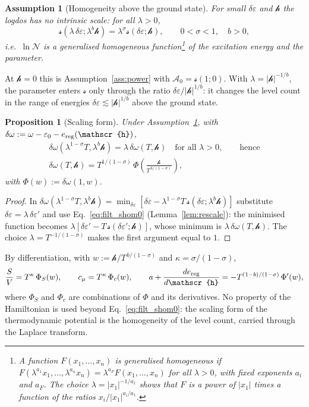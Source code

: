 \documentclass[10pt,a4paper]{article}
\theoremstyle{plain}
\newtheorem{proposition}{Proposition}
\newtheorem{assumption}{Assumption}
\newcommand{\cN}{\mathcal{N}}   %
\newcommand{\cA}{{\mathcal{A}_0}}   %
\newcommand{\lndos}{{logdos}}  %
\newcommand{\hfield}{\mathscr{h}}  %
\newcommand{\lds}{\mathscr{s}}  %
\begin{document}
\begin{assumption}[Homogeneity above the ground state]\label{ass:hom0}
For small $\delta\varepsilon$ and $\hfield$ the \lndos{} has no intrinsic
scale: for all $\lambda>0$,
\begin{equation}\label{eq:filt_shom0}
  \lds(\lambda\,\delta\varepsilon;\lambda^{b}\hfield)=\lambda^{\sigma}\lds(\delta\varepsilon;\hfield) ,
  \qquad 0<\sigma<1 ,\quad b>0 ,
\end{equation}
i.e.\ $\ln\cN$ is a generalised homogeneous function\footnote{A function
$F(x_1,\dots,x_n)$ is \emph{generalised homogeneous} if
$F(\lambda^{a_1}x_1,\dots,\lambda^{a_n}x_n)=\lambda^{a_F}F(x_1,\dots,x_n)$ for
all $\lambda>0$, with fixed exponents $a_i$ and $a_F$. The choice
$\lambda=|x_1|^{-1/a_1}$ shows that $F$ is a power of $|x_1|$ times a
function of the ratios $x_i/|x_1|^{a_i/a_1}$.} of the excitation energy and
the parameter.
\end{assumption}
At $ \hfield=0 $ this is Assumption~\ref{ass:power} with $ \cA = \lds(1;0) $.
With $\lambda=|\hfield|^{-1/b}$, the parameter enters $\lds$ only through the
ratio $\delta\varepsilon/|\hfield|^{1/b}$: it changes the level count in the
range of energies $\delta\varepsilon\lesssim|\hfield|^{1/b}$ above the ground
state.

\begin{proposition}[Scaling form]\label{prop:scaling0}
Under Assumption~\ref{ass:hom0}, with
$\delta\omega:=\omega-\varepsilon_0-e_{\rm reg}(\hfield)$,
\begin{equation}\label{eq:filt_scalingform}
\begin{gathered}
  \delta\omega(\lambda^{1-\sigma}T,\lambda^{b}\hfield)=\lambda\,\delta\omega(T,\hfield)
  \quad\text{for all }\lambda>0 ,\qquad\text{hence}
  \\
  \delta\omega(T,\hfield)=T^{1/(1-\sigma)}\,\Phi\left(\frac{\hfield}{T^{\,b/(1-\sigma)}}\right),
\end{gathered}
\end{equation}
with $\Phi(w):=\delta\omega(1,w)$.
\end{proposition}
\begin{proof}
In $\delta\omega(\lambda^{1-\sigma}T,\lambda^{b}\hfield)
=\min_{\delta\varepsilon}[\delta\varepsilon-\lambda^{1-\sigma}T\,\lds(\delta\varepsilon;\lambda^{b}\hfield)]$
substitute $\delta\varepsilon=\lambda\,\delta\varepsilon'$ and use
Eq.~\eqref{eq:filt_shom0} (Lemma~\ref{lem:rescale}): the minimised function
becomes $\lambda[\delta\varepsilon'-T\,\lds(\delta\varepsilon';\hfield)]$, whose
minimum is $\lambda\,\delta\omega(T,\hfield)$. The choice
$\lambda=T^{-1/(1-\sigma)}$ makes the first argument equal to $1$.
\end{proof}
By differentiation, with $ w:=\hfield/T^{\,b/(1-\sigma)} $ and
$\kappa=\sigma/(1-\sigma)$,
\[
  \frac{S}{V}=T^{\kappa}\,\Phi_S(w) ,\qquad
  c_\mu=T^{\kappa}\,\Phi_c(w) ,\qquad
  a+\frac{de_{\rm reg}}{d\hfield}=-T^{(1-b)/(1-\sigma)}\,\Phi'(w) ,
\]
where $ \Phi_S $ and $ \Phi_c $ are combinations of $ \Phi $ and its
derivatives. No property of the Hamiltonian is used beyond
Eq.~\eqref{eq:filt_shom0}: the scaling form of the thermodynamic potential
is the homogeneity of the level count, carried through the Laplace
transform.
\end{document}
